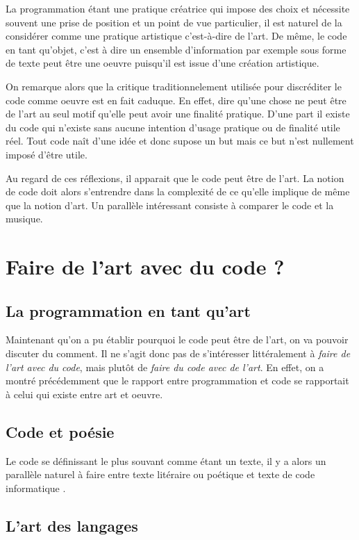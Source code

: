 \documentclass[12pt]{article} %
\begin{document}
La programmation étant une pratique créatrice qui impose des choix et nécessite souvent une prise de position et un point de vue particulier, il est naturel de la considérer comme une pratique artistique c'est-à-dire de l'art. De même, le code en tant qu'objet, c'est à dire un ensemble d'information par exemple sous forme de texte peut être une oeuvre puisqu'il est issue d'une création artistique.

On remarque alors que la critique traditionnelement utilisée pour discréditer le code comme oeuvre est en fait caduque. En effet, dire qu'une chose ne peut être de l'art au seul motif qu'elle peut avoir une finalité pratique. D'une part il existe du code qui n'existe sans aucune intention d'usage pratique ou de finalité utile réel. Tout code naît d'une idée et donc supose un but mais ce but n'est nullement imposé d'être utile. 

Au regard de ces réflexions, il apparait que le code peut être de l'art. La notion de code doit alors s'entrendre dans la complexité de ce qu'elle implique de même que la notion d'art. Un parallèle intéressant consiste à comparer le code et la musique.

\section{Faire de l'art avec du code ?}

\subsection{La programmation en tant qu'art}
Maintenant qu'on a pu établir pourquoi le code peut être de l'art, on va pouvoir discuter du comment. Il ne s'agit donc pas de s'intéresser littéralement à \textit{faire de l'art avec du code}, mais plutôt de \textit{faire du code avec de l'art}. En effet, on a montré précédemment que le rapport entre programmation et code se rapportait à celui qui existe entre art et oeuvre.

\subsection{Code et poésie}
Le code se définissant le plus souvant comme étant un texte, il y a alors un parallèle naturel à faire entre texte litéraire ou poétique et texte de code informatique \cite{FCramer2001}.

\subsection{L'art des langages}
\end{document}
